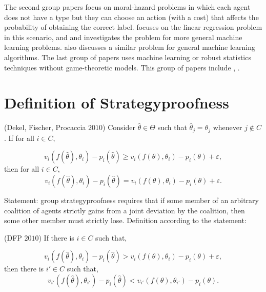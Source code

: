 \documentclass{article}
\begin{document}
The second group papers focus on moral-hazard problems in which each agent does not have a type but they can choose an action (with a cost) that affects the probability of obtaining the correct label. \citet*{richardsonprivately} focuses on the linear regression problem in this scenario, and \citet*{cai2015optimum} and \citet*{shah2016double} investigates the problem for more general machine learning problems. \citet*{mihailescu2010strategy} also discusses a similar problem for general machine learning algorithms.
\newline \newline
The last group of papers uses machine learning or robust statistics techniques without game-theoretic models. This group of papers include \citet*{dekel2009vox}, \citet*{dekel2009good}.
\newline \newline



\section{Definition of Strategyproofness} 
\begin{df} \label{df:sp1} 
(Dekel, Fischer, Procaccia $2010$) Consider $\hat{\theta} \in \Theta$ such that $\hat{\theta}_{j} = \theta_{j}$ whenever $j  \notin C $. If for all $i  \in C, $
\end{df}
\begin{equation} 
v_{i}\left(f\left(\hat{\theta}\right), \theta_{i}\right) - p_{i}\left(\hat{\theta}\right) \geq  v_{i}\left(f\left(\theta\right), \theta_{i}\right) - p_{i}\left(\theta\right) + \varepsilon,
\end{equation}
then for all $i  \in C, $
\begin{equation} 
v_{i}\left(f\left(\hat{\theta}\right), \theta_{i}\right) - p_{i}\left(\hat{\theta}\right) = v_{i}\left(f\left(\theta\right), \theta_{i}\right) - p_{i}\left(\theta\right) + \varepsilon.
\end{equation}

Statement: group strategyproofness requires that if some member of an arbitrary coalition of agents strictly gains from a joint deviation by the coalition, then some other member must strictly lose.
\newline \newline
Definition according to the statement:
\begin{df} \label{df:sp1p} 
(DFP $2010$) If there is $i  \in C $ such that,
\end{df}
\begin{equation} 
v_{i}\left(f\left(\hat{\theta}\right), \theta_{i}\right) - p_{i}\left(\hat{\theta}\right) > v_{i}\left(f\left(\theta\right), \theta_{i}\right) - p_{i}\left(\theta\right) + \varepsilon,
\end{equation}
then there is $i' \in C $ such that,
\begin{equation} 
v_{i'}\left(f\left(\hat{\theta}\right), \theta_{i'}\right) - p_{i}\left(\hat{\theta}\right) < v_{i'}\left(f\left(\theta\right), \theta_{i'}\right) - p_{i}\left(\theta\right).
\end{equation}
\end{document}
